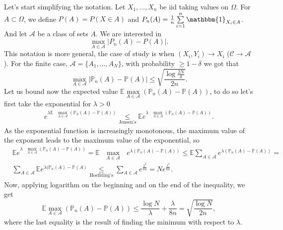 \documentclass[11pt, english]{article}
\begin{document}
Let's start simplifying the notation. Let $X_1,\dots,X_n$ be iid taking values on $\Omega$. For $A\subset \Omega$, we define $P(A)=P(X\in A)$ and $P_n(A)=\frac{1}{n}\sum\limits_{i=1}^n\mathbbm{1}_{X_i\in A}$. And let $\mathcal{A}$ be a class of sets $A$. We are interested in 
\begin{equation}
	\underset{A\in\mathcal{A}}{\max}|P_n(A)-P(A)|.
\end{equation}
This notation is more general, the case of study is when $(X_i,Y_i)\rightarrow X_i$ ($\mathcal{C}\rightarrow \mathcal{A}$). For the finite case, $\mathcal{A}=\{A_1,\dots,A_N\}$, with probability $\geq 1-\delta$ we got that 
\begin{equation}
	\underset{A\in\mathcal{A}}{\max}|\mathbb{P}_n(A)-\mathbb{P}(A)|\leq\sqrt{\frac{\log\frac{2N}{\delta}}{2n}}.
\end{equation}
Let us bound now the expected value $\mathbb{E}\underset{A\in\mathcal{A}}{\max}(\mathbb{P}_n(A)-\mathbb{P}(A))$, to do so let's first take the exponential for $\lambda>0$
\begin{align}
	e^{\lambda\mathbb{E}\text{ }\underset{A\in\mathcal{A}}{\max}(\mathbb{P}_n(A)-\mathbb{P}(A))}\underset{\text{Jensen's}}{\leq}\mathbb{E}e^{\lambda\text{ }\underset{A\in\mathcal{A}}{\max}(\mathbb{P}_n(A)-\mathbb{P}(A))}.
\end{align}
As the exponential function is increasingly monotonous, the maximum value of the exponent leads to the maximum value of the exponential, so 
\begin{align}
	&\mathbb{E}e^{\lambda\text{ }\underset{A\in\mathcal{A}}{\max}(\mathbb{P}_n(A)-\mathbb{P}(A))}=\mathbb{E}\text{ }\underset{A\in\mathcal{A}}{\max}\text{ }e^{\lambda(\mathbb{P}_n(A)-\mathbb{P}(A))}\leq\mathbb{E}\sum\limits_{A\in\mathcal{A}}e^{\lambda(\mathbb{P}_n(A)-\mathbb{P}(A))}=\\
	&\sum\limits_{A\in\mathcal{A}}\mathbb{E}e^{\lambda(\mathbb{P}_n(A)-\mathbb{P}(A)}\underset{\text{Hoeffding's}}{\leq}\sum\limits_{A\in\mathcal{A}}e^{\frac{\lambda^2}{8n}}=Ne^{\frac{\lambda^2}{8n}}.
\end{align}
Now, applying logarithm on the beginning and on the end of the inequality, we get
\begin{equation}
	\mathbb{E}\underset{A\in\mathcal{A}}{\max}(\mathbb{P}_n(A)-\mathbb{P}(A))\leq\frac{\log N}{\lambda}+\frac{\lambda}{8n}=\sqrt{\frac{\log N}{2n}},
\end{equation}
where the last equality is the result of finding the minimum with respect to $\lambda$.\\
\end{document}
